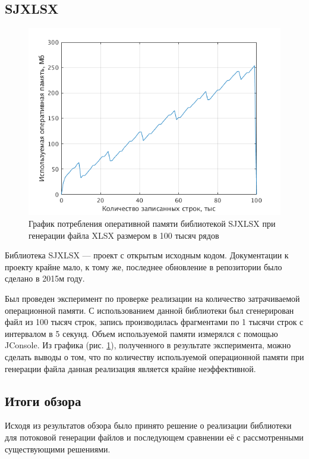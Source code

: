 \documentclass[14pt]{matmex-diploma}
\begin{document}
\subsection{SJXLSX}
    \begin{figure}
        \centering
        \includegraphics[width=\textwidth]{pics/SJXLSX.png}
        \caption{График потребления оперативной памяти библиотекой SJXLSX при генерации файла XLSX размером в 100 тысяч рядов \label{sjxlsx}}
    \end{figure}
    Библиотека SJXLSX \cite{sjxlsx}--- проект с открытым исходным кодом. Документации к проекту крайне мало, к тому же, последнее обновление в репозитории было сделано в 2015м году. 
    
    Был проведен эксперимент по проверке реализации на количество затрачиваемой операционной памяти. С использованием данной библиотеки был сгенерирован файл из 100 тысяч строк, запись производилась фрагментами по 1 тысячи строк с интервалом в 5 секунд. Объем используемой памяти измерялся с помощью JConsole. Из графика (рис. \ref{sjxlsx}), полученного в результате эксперимента, можно сделать выводы о том, что по количеству используемой операционной памяти при генерации файла данная реализация является крайне неэффективной.
    
\subsection{Итоги обзора}
    Исходя из результатов обзора было принято решение о реализации библиотеки для потоковой генерации файлов и последующем сравнении её с рассмотренными существующими решениями.
    
\end{document}
